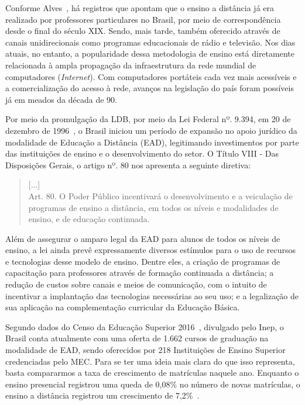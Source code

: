 

\label{chap:intro}
Conforme Alves~\cite{alves2009}, há registros que apontam que o ensino a distância já era realizado por professores particulares no Brasil, por meio de correspondência desde o final do século XIX. Sendo, mais tarde, também oferecido através de canais unidirecionais como programas educacionais de rádio e televisão. Nos dias atuais, no entanto, a popularidade dessa metodologia de ensino está diretamente relacionada à ampla propagação da infraestrutura da rede mundial de computadores (\emph{Internet}). Com computadores portáteis cada vez mais acessíveis e a comercialização do acesso à rede, avanços na legislação do país foram possíveis já em meados da década de 90. 

Por meio da promulgação da \acrfull{LDB}, por  meio  da Lei Federal nº. 9.394, em 20 de dezembro de 1996~\cite{brasilLDB}, o Brasil iniciou um período de expansão no apoio jurídico da modalidade de Educação a Distância (EAD), legitimando investimentos por parte das instituições de ensino e o desenvolvimento do setor. O Título VIII - Das Disposições Gerais, o artigo nº. 80 nos apresenta a seguinte diretiva:

\begin{quote}
[...]\\Art. 80. O Poder Público incentivará o desenvolvimento e a veiculação de programas de ensino a distância, em todos os níveis e modalidades de ensino, e de educação continuada.~\cite{brasilLDB}
\end{quote}%

Além de assegurar o amparo legal da \acrfull{EAD} para alunos de todos os níveis de ensino, a lei ainda prevê expressamente diversos estímulos para o uso de recursos e tecnologias desse modelo de ensino. Dentre eles, a criação de programas de capacitação para professores através de formação continuada a distância; a redução de custos sobre canais e meios de comunicação, com o intuito de incentivar a implantação das tecnologias necessárias ao seu uso; e a legalização de sua aplicação na complementação curricular da Educação Básica. 

Segundo dados do Censo da Educação Superior 2016~\cite{inep2016sinopse}, divulgado pelo \acrfull{Inep}, o Brasil conta atualmente com uma oferta de 1.662 cursos de graduação na modalidade de EAD, sendo oferecidos por 218 Instituições de Ensino Superior credenciadas pelo \acrfull{MEC}. Para se ter uma ideia mais clara do que isso representa, basta compararmos a taxa de crescimento de matrículas naquele ano. Enquanto o ensino presencial registrou uma queda de 0,08{\%} no número de novas matrículas, o ensino a distância registrou um crescimento de 7,2{\%}~\cite{exame@ead}.

